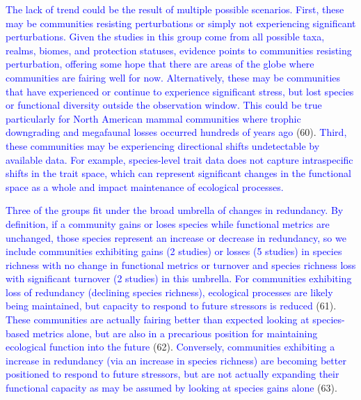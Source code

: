 \documentclass{article}
\begin{document}
\textcolor{blue}{The lack of trend could be the result of multiple possible scenarios. First, these may be communities resisting perturbations or simply not experiencing significant perturbations. Given the studies in this group come from all possible taxa, realms, biomes, and protection statuses, evidence points to communities resisting perturbation, offering some hope that there are areas of the globe where communities are fairing well for now. Alternatively, these may be communities that have experienced or continue to experience significant stress, but lost species or functional diversity outside the observation window. This could be true particularly for North American mammal communities where trophic downgrading and megafaunal losses occurred hundreds of years ago }(60).
\textcolor{blue}{Third, these communities may be experiencing directional shifts undetectable by available data. For example, species-level trait data does not capture intraspecific shifts in the trait space, which can represent significant changes in the functional space as a whole and impact maintenance of ecological processes.}

\textcolor{blue}{Three of the groups fit under the broad umbrella of changes in redundancy. By definition, if a community gains or loses species while functional metrics are unchanged, those species represent an increase or decrease in redundancy, so we include communities exhibiting gains (2 studies) or losses (5 studies) in species richness with no change in functional metrics or turnover and species richness loss with significant turnover (2 studies) in this umbrella. For communities exhibiting loss of redundancy (declining species richness), ecological processes are likely being maintained, but capacity to respond to future stressors is reduced }(61).
\textcolor{blue}{These communities are actually fairing better than expected looking at species-based metrics alone, but are also in a precarious position for maintaining ecological function into the future }(62).
\textcolor{blue}{Conversely, communities exhibiting a increase in redundancy (via an increase in species richness) are becoming better positioned to respond to future stressors, but are not actually expanding their functional capacity as may be assumed by looking at species gains alone}
(63).
\end{document}
